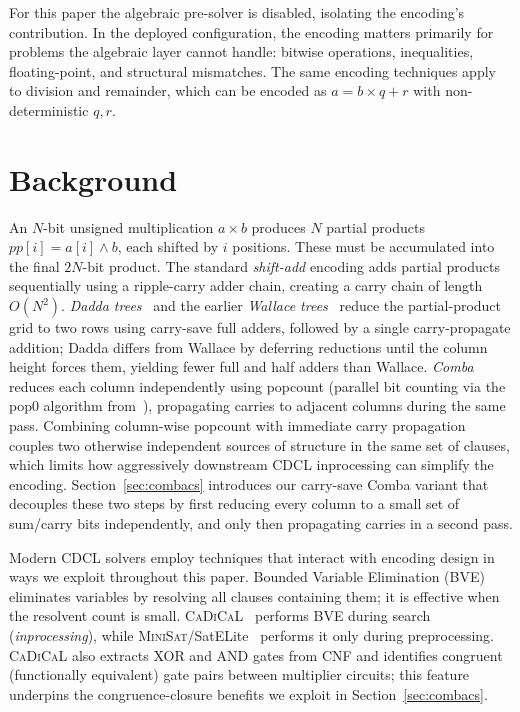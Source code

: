 \documentclass[a4paper]{ceurart}
\newcommand{\cadical}{\textsc{CaDiCaL}\xspace}
\newcommand{\minisat}{\textsc{MiniSat}\xspace}
\begin{document}
For this paper the algebraic pre-solver is disabled, isolating
the encoding's contribution. In the deployed configuration, the
encoding matters primarily for problems the algebraic layer
cannot handle: bitwise operations, inequalities, floating-point,
and structural mismatches. The same encoding techniques apply to
division and remainder, which can be encoded as
$a = b \times q + r$ with non-deterministic $q, r$.

\section{Background}

An $N$-bit unsigned multiplication $a \times b$ produces $N$ partial
products $\mathit{pp}[i] = a[i] \wedge b$, each shifted by $i$
positions. These must be accumulated into the final $2N$-bit product.
The standard \emph{shift-add} encoding adds partial products
sequentially using a ripple-carry adder chain, creating a carry chain
of length $O(N^2)$. \emph{Dadda trees}~\cite{dadda1965some} and
the earlier \emph{Wallace trees}~\cite{wallace1964suggestion} reduce
the partial-product grid to two rows using carry-save full adders,
followed by a single carry-propagate addition; Dadda differs from
Wallace by deferring reductions until the column height forces them,
yielding fewer full and half adders than Wallace.
\emph{Comba}~\cite{comba1990exponentiation} reduces each column
independently using popcount (parallel bit counting via the pop0
algorithm from~\cite{warren2012hackers}), propagating carries to
adjacent columns during the same pass. Combining column-wise
popcount with immediate carry propagation couples two otherwise
independent sources of structure in the same set of clauses, which
limits how aggressively downstream CDCL inprocessing can
simplify the encoding. Section~\ref{sec:combacs} introduces our
carry-save Comba variant that decouples these two steps by first
reducing every column to a small set of sum/carry bits independently,
and only then propagating carries in a second pass.

Modern CDCL solvers employ techniques that interact with encoding
design in ways we exploit throughout this paper. Bounded Variable
Elimination (BVE)~\cite{een2005effective} eliminates variables by
resolving all clauses containing them; it is effective when the
resolvent count is small. \cadical~\cite{biere2019cadical} performs
BVE during search (\emph{inprocessing}), while
\minisat/SatELite~\cite{een2005effective} performs it only during
preprocessing. \cadical also extracts XOR and AND gates from CNF
and identifies congruent (functionally equivalent) gate pairs
between multiplier circuits; this feature underpins the
congruence-closure benefits we exploit in
Section~\ref{sec:combacs}.
\end{document}
